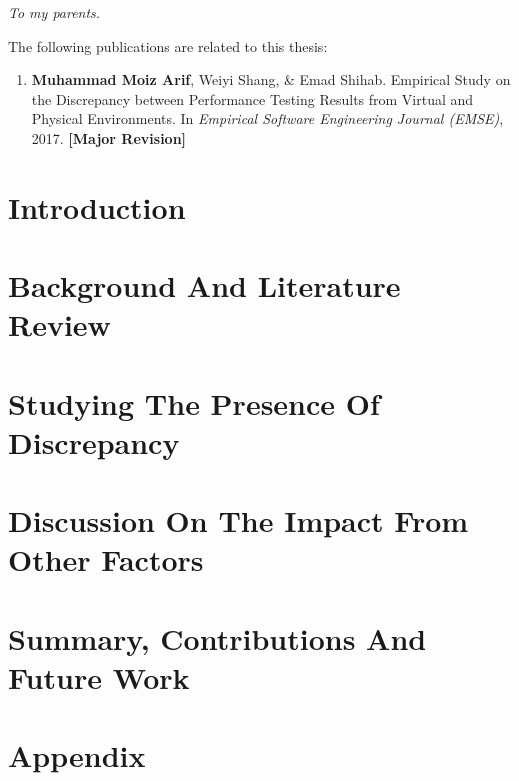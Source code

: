 \documentclass[12pt]{report}
\begin{document}
\begin{dedication}
	\begin{flushright}
		\textit{To my parents.}
	\end{flushright}

	
\end{dedication}

\begin{publications}

The following publications are related to this thesis:

\begin{enumerate}

\item {\textbf{Muhammad Moiz Arif}, Weiyi Shang, \& Emad Shihab. Empirical Study on the Discrepancy between Performance Testing Results from Virtual and Physical Environments. In \textit{Empirical Software Engineering Journal (EMSE)}, 2017. \textbf{[Major Revision]}} 

\end{enumerate}

\end{publications}

\chapter{Introduction}
\label{introduction}


\chapter{Background And Literature Review}
\label{background_and_literature_review}


\chapter{Studying The Presence Of Discrepancy}
\label{chapter3}


\chapter{Discussion On The Impact From Other Factors}
\label{chapter4}


\chapter{Summary, Contributions And Future Work}
\label{conclusion}


\chapter{Appendix}
\label{appendix}


  

\end{document}
